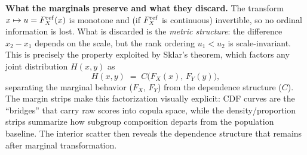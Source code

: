 \documentclass[10pt]{article}
\begin{document}
\begin{minipage}[t]{7.8in}
\begin{minipage}{7.4in}
    \vspace{6pt}
    \textbf{What the marginals preserve and what they discard.}\enspace
    The transform $x \mapsto u = F_X^{\mathrm{ref}}(x)$ is monotone and (if $F_X^{\mathrm{ref}}$ is
    continuous) invertible, so no ordinal information is lost.
    What is discarded is the \emph{metric structure}: the difference
    $x_2 - x_1$ depends on the scale, but the rank ordering
    $u_1 < u_2$ is scale-invariant. This is precisely the property exploited by
    Sklar's theorem, which factors any joint distribution $H(x,y)$ as
    \begin{equation}
      H(x,y) \;=\; C\bigl(F_X(x),\, F_Y(y)\bigr),
      \tag{M.4}
    \end{equation}
    separating the marginal behavior ($F_X$, $F_Y$) from the dependence
    structure ($C$). The margin strips make this factorization visually explicit:
    CDF curves are the ``bridges'' that carry raw scores into copula space, while
    the density/proportion strips summarize how subgroup composition departs from
    the population baseline. The interior scatter then reveals the dependence
    structure that remains after marginal transformation.

  \end{minipage}
  \vspace{0.1in}
\end{minipage}
\end{document}
